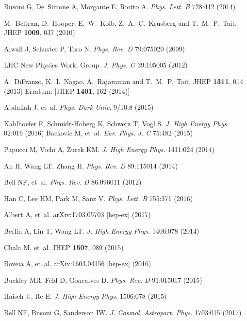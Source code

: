 \documentclass{ar-1col}
\begin{document}
\begin{thebibliography}{175}
Busoni G, De~Simone A, Morgante E, Riotto A. \textit{Phys. Lett.}
\textit{B} 728:412 (2014)

  M.~Beltran, D.~Hooper, E.~W.~Kolb, Z.~A.~C.~Krusberg and T.~M.~P.~Tait,
  JHEP {\bf 1009}, 037 (2010)

Alwall J, Schuster P, Toro N. \textit{Phys. Rev.} \textit{D} 79:075020
(2009)

{LHC New Physics Work. Group}. \textit{J. Phys.} \textit{G} 39:105005
(2012)

  A.~DiFranzo, K.~I.~Nagao, A.~Rajaraman and T.~M.~P.~Tait,
  JHEP {\bf 1311}, 014 (2013)
  Erratum: [JHEP {\bf 1401}, 162 (2014)]

Abdallah J, et~al. \textit{Phys. Dark Univ.} 9/10:8 (2015)

Kahlhoefer F, Schmidt-Hoberg K, Schwetz T, Vogl S. \textit{J. High Energy Phys.}
02:016 (2016)
Backovic M, et~al. \textit{Eur. Phys. J.} \textit{C} 75:482 (2015)

Papucci M, Vichi A, Zurek KM. \textit{J. High Energy Phys.} 1411:024 (2014)

An H, Wang LT, Zhang H. \textit{Phys. Rev.} \textit{D} 89:115014 (2014)

Bell NF, et~al. \textit{Phys. Rev.} \textit{D} 86:096011 (2012)

Han C, Lee HM, Park M, Sanz V. \textit{Phys. Lett.} \textit{B} 755:371
(2016)

Albert A, et~al. arXiv:1703.05703 [hep-ex] (2017)

Berlin A, Lin T, Wang LT. \textit{J. High Energy Phys.} 1406:078 (2014)

Chala M, et~al. JHEP {\bf 1507}, 089 (2015)

Boveia A, et~al. arXiv:1603.04156 [hep-ex] (2016)

Buckley MR, Feld D, Goncalves D. \textit{Phys. Rev.} \textit{D} 91:015017
(2015)

Haisch U, Re E. \textit{J. High Energy Phys.} 1506:078 (2015)

Bell NF, Busoni G, Sanderson IW. \textit{J. Cosmol. Astropart. Phys.} 1703:015 (2017)


\end{thebibliography}
\end{document}
